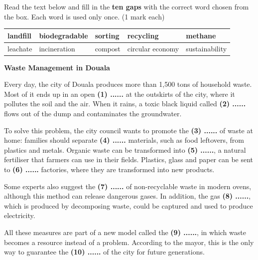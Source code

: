\documentclass[11pt]{article}
\begin{document}
\begin{exercice}
Read the text below and fill in the \textbf{ten gaps} with the correct word chosen from the box. Each word is used only once. (1 mark each)

\begin{center}
\begin{tabularx}{\linewidth}{|X|X|X|X|X|}
\hline
\rowcolor{popblueL} landfill & biodegradable & sorting & recycling & methane \\
\hline
\rowcolor{popblueL} leachate & incineration & compost & circular economy & sustainability \\
\hline
\end{tabularx}
\end{center}

\textbf{Waste Management in Douala}

Every day, the city of Douala produces more than 1,500 tons of household waste. Most of it ends up in an open \textbf{(1) ......} at the outskirts of the city, where it pollutes the soil and the air. When it rains, a toxic black liquid called \textbf{(2) ......} flows out of the dump and contaminates the groundwater.

To solve this problem, the city council wants to promote the \textbf{(3) ......} of waste at home: families should separate \textbf{(4) ......} materials, such as food leftovers, from plastics and metals. Organic waste can be transformed into \textbf{(5) ......}, a natural fertiliser that farmers can use in their fields. Plastics, glass and paper can be sent to \textbf{(6) ......} factories, where they are transformed into new products.

Some experts also suggest the \textbf{(7) ......} of non-recyclable waste in modern ovens, although this method can release dangerous gases. In addition, the gas \textbf{(8) ......}, which is produced by decomposing waste, could be captured and used to produce electricity.

All these measures are part of a new model called the \textbf{(9) ......}, in which waste becomes a resource instead of a problem. According to the mayor, this is the only way to guarantee the \textbf{(10) ......} of the city for future generations.
\end{exercice}
\end{document}
